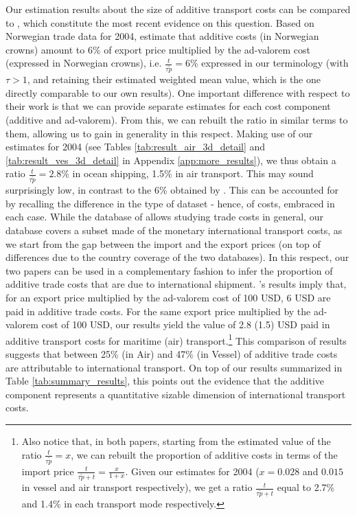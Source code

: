 \documentclass[a4paper,11pt]{article}
\begin{document}
Our estimation results about the size of additive transport costs can be compared to \citet{Irrazabal_2015}, which constitute the most recent evidence on this question.
Based on Norwegian trade data for 2004, \citet{Irrazabal_2015} estimate that additive costs (in Norwegian crowns) amount to 6\% of export price multiplied by the ad-valorem cost (expressed in Norwegian crowns), i.e.
$\frac{t}{\tau\widetilde{p}}=6\%$ expressed in our terminology (with $\tau>1$, and retaining their estimated weighted mean value, which is the one directly comparable to our own results).
One important difference with respect to their work is that we can provide separate estimates for each cost component (additive and ad-valorem).
From this, we can rebuilt the ratio in similar terms to them, allowing us to gain in generality in this respect.
Making use of our estimates for 2004 (see Tables \ref{tab:result_air_3d_detail} and \ref{tab:result_ves_3d_detail} in Appendix \ref{app:more_results}), we thus obtain a ratio $\frac{t}{\tau\widetilde{p}}=2.8\%$ in ocean shipping, 1.5\% in air transport.
This may sound surprisingly low, in contrast to the 6\% obtained by \citet{Irrazabal_2015}.
This can be accounted for by recalling the difference in the type of dataset - hence, of costs, embraced in each case.
While the database of \citet{Irrazabal_2015} allows studying trade costs in general, our database covers a subset made of the monetary international transport costs, as we start from the gap between the import and the export prices (on top of differences due to the country coverage of the two databases).
In this respect, our two papers can be used in a complementary fashion to infer the proportion of additive trade costs that are due to international shipment.
\citet{Irrazabal_2015}'s results imply that, for an export price multiplied by the ad-valorem cost of 100 USD, 6 USD are paid in additive trade costs.
For the same export price multiplied by the ad-valorem cost of 100 USD, our results yield the value of 2.8 (1.5) USD paid in additive transport costs for maritime (air) transport.\footnote{Also notice that, in both papers, starting from the estimated value of the ratio $\frac{t}{\tau \widetilde{p}}= x$, we can rebuilt the proportion of additive costs in terms of the import price $\frac{t}{\tau \widetilde{p} + t} = \frac{x}{1+x}$.
Given our estimates for 2004 ($x = 0.028$ and $0.015$ in vessel and air transport respectively), we get a ratio $\frac{t}{\tau \widetilde{p} + t}$ equal to 2.7\% and 1.4\% in each transport mode respectively.} This comparison of results suggests that between 25\% (in Air) and 47\% (in Vessel) of additive trade costs are attributable to international transport.
On top of our results summarized in Table \ref{tab:summary_results}, this points out the evidence that the additive component represents a quantitative sizable dimension of international transport costs.\smallskip
\end{document}
